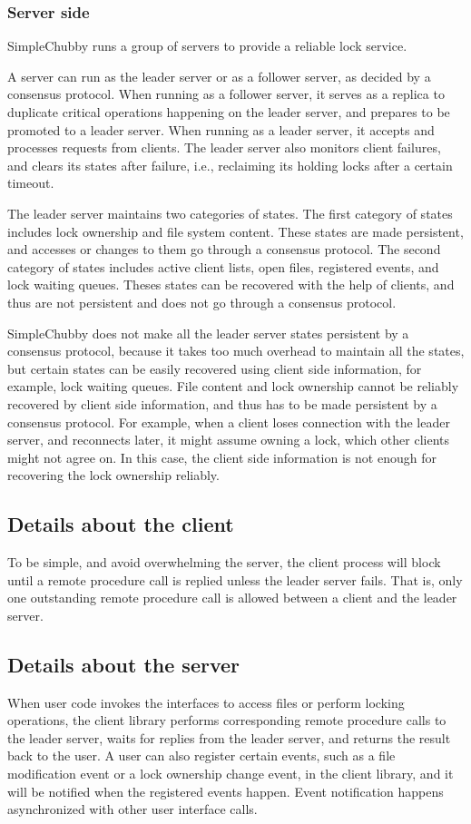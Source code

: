 \subsubsection{Server side}

SimpleChubby runs a group of servers to provide a reliable lock service.

A server can run as the leader server or as a follower server,
as decided by a consensus protocol.
When running as a follower server, it serves as a replica to duplicate critical
operations happening on the leader server, and prepares to be promoted to a leader server.
When running as a leader server, it accepts and processes requests from clients.
The leader server also monitors client failures, and clears its states after failure,
i.e., reclaiming its holding locks after a certain timeout.

The leader server maintains two categories of states.
The first category of states includes lock ownership and file system content. These
states are made persistent, and accesses or changes to them go through a consensus protocol.
The second category of states includes active client lists,
open files, registered events, and lock waiting queues.
Theses states can be recovered with the help of clients,
and thus are not persistent and does not go through a consensus protocol.

SimpleChubby does not make all the leader server states persistent by a consensus protocol,
because it takes too much overhead to maintain all the states,
but certain states can be easily recovered
using client side information, for example, lock waiting queues.
File content and lock ownership cannot be reliably recovered by client
side information, and thus has to be made persistent by a consensus protocol.
For example, when a client loses connection with the leader server,
and reconnects later,
it might assume owning a lock, which other clients might not agree on.
In this case, the client side information is not enough for recovering
the lock ownership reliably.
 
\subsection{Details about the client}
To be simple, and avoid overwhelming the server, the client process will block until a remote procedure call is
replied unless the leader server fails. That is, only one outstanding remote procedure call is allowed between
a client and the leader server.

\subsection{Details about the server}
When user code invokes the interfaces to access files or perform locking operations,
the client library performs corresponding remote procedure calls to the leader server,
waits for replies from the leader server, and returns the result back to the user.
A user can also register certain events,
such as a file modification event or a lock ownership change event, 
in the client library,
and it will be notified when the registered events happen.
Event notification happens asynchronized with other user interface calls.

